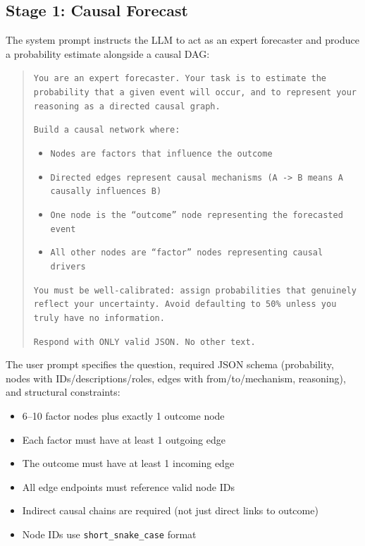 \documentclass[11pt]{article}
\begin{document}
\subsection{Stage 1: Causal Forecast}
\label{app:prompt-forecast}

The system prompt instructs the LLM to act as an expert forecaster and produce a probability estimate alongside a causal DAG:

\begin{quote}
\small
\texttt{You are an expert forecaster. Your task is to estimate the probability that a given event will occur, and to represent your reasoning as a directed causal graph.}

\texttt{Build a causal network where:}
\begin{itemize}
\small
\item \texttt{Nodes are factors that influence the outcome}
\item \texttt{Directed edges represent causal mechanisms (A -> B means A causally influences B)}
\item \texttt{One node is the ``outcome'' node representing the forecasted event}
\item \texttt{All other nodes are ``factor'' nodes representing causal drivers}
\end{itemize}

\texttt{You must be well-calibrated: assign probabilities that genuinely reflect your uncertainty. Avoid defaulting to 50\% unless you truly have no information.}

\texttt{Respond with ONLY valid JSON. No other text.}
\end{quote}

The user prompt specifies the question, required JSON schema (probability, nodes with IDs/descriptions/roles, edges with from/to/mechanism, reasoning), and structural constraints:
\begin{itemize}
\small
\item 6--10 factor nodes plus exactly 1 outcome node
\item Each factor must have at least 1 outgoing edge
\item The outcome must have at least 1 incoming edge
\item All edge endpoints must reference valid node IDs
\item Indirect causal chains are required (not just direct links to outcome)
\item Node IDs use \texttt{short\_snake\_case} format
\end{itemize}
\end{document}
